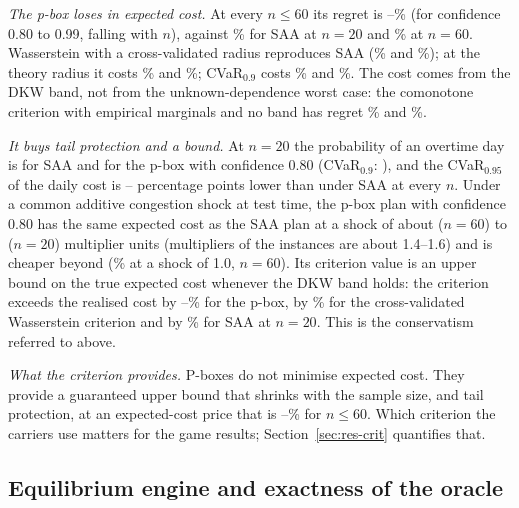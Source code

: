 \documentclass[preprint,11pt]{elsarticle}
\theoremstyle{definition}
\theoremstyle{remark}
\begin{document}
\emph{The p-box loses in expected cost.} At every $n\le60$ its regret is \AmbRegMin--\AmbRegMax\% (for confidence 0.80 to 0.99, falling with $n$), against \AmbSaaRegTwoZero\% for SAA at $n=20$ and \AmbSaaRegSixZero\% at $n=60$. Wasserstein with a cross-validated radius reproduces SAA (\AmbWcvRegTwoZero\% and \AmbWcvRegSixZero\%); at the theory radius it costs \AmbWthRegTwoZero\% and \AmbWthRegSixZero\%; CVaR$_{0.9}$ costs \AmbCvarRegTwoZero\% and \AmbCvarRegSixZero\%. The cost comes from the DKW band, not from the unknown-dependence worst case: the comonotone criterion with empirical marginals and no band has regret \AmbEmpRegTwoZero\% and \AmbEmpRegSixZero\%.

\emph{It buys tail protection and a bound.} At $n=20$ the probability of an overtime day is \AmbOtSaaTwoZero{} for SAA and \AmbOtPbTwoZero{} for the p-box with confidence 0.80 (CVaR$_{0.9}$: \AmbOtCvarTwoZero), and the CVaR$_{0.95}$ of the daily cost is \AmbCvarGainLo--\AmbCvarGainHi{} percentage points lower than under SAA at every $n$. Under a common additive congestion shock at test time, the p-box plan with confidence 0.80 has the same expected cost as the SAA plan at a shock of about \AmbCrossSixty{} ($n=60$) to \AmbCrossTwenty{} ($n=20$) multiplier units (multipliers of the instances are about 1.4--1.6) and is cheaper beyond (\AmbShiftOneSixty\% at a shock of 1.0, $n=60$). Its criterion value is an upper bound on the true expected cost whenever the DKW band holds: the criterion exceeds the realised cost by \AmbDisPbMin--\AmbDisPbMax\% for the p-box, by \AmbDisWcvTwoZero\% for the cross-validated Wasserstein criterion and by \AmbDisSaaTwoZero\% for SAA at $n=20$. This is the conservatism referred to above.

\emph{What the criterion provides.} P-boxes do not minimise expected cost. They provide a guaranteed upper bound that shrinks with the sample size, and tail protection, at an expected-cost price that is \AmbRegMin--\AmbRegMax\% for $n\le60$. Which criterion the carriers use matters for the game results; Section~\ref{sec:res-crit} quantifies that.

\subsection{Equilibrium engine and exactness of the oracle}\label{sec:res-engine}
\end{document}
